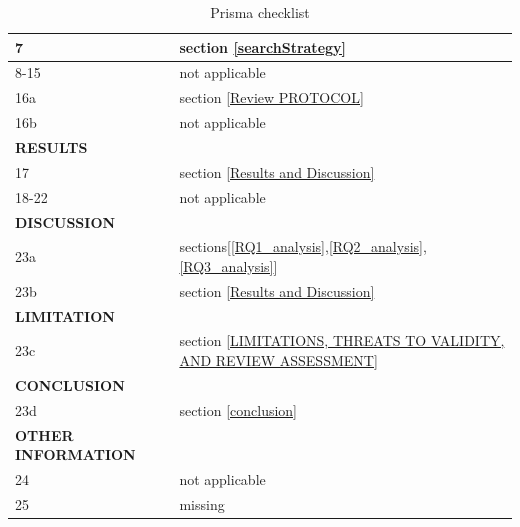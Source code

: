 \documentclass{svproc}
\begin{document}
\begin{table}[]
\begin{tabular}{|ll|l|}
\multicolumn{2}{|l|}{7}                                      & section \ref{searchStrategy}                                          \\ \hline
\multicolumn{2}{|l|}{8-15}                                   & not applicable                                                \\ \hline
\multicolumn{2}{|l|}{16a}                                    & section \ref{Review PROTOCOL}                                                        \\ \hline
\multicolumn{2}{|l|}{16b}                                    & not applicable                                                \\ \hline
\multicolumn{2}{|l|}{\textbf{RESULTS}}                       &                                                               \\ \hline
\multicolumn{2}{|l|}{17}                                     & section \ref{Results and Discussion}                                                    \\ \hline
\multicolumn{2}{|l|}{18-22}                                  & not applicable                                                \\ \hline
\multicolumn{2}{|l|}{\textbf{DISCUSSION}}                    &                                                               \\ \hline
\multicolumn{2}{|l|}{23a}                                    & sections[\ref{RQ1_analysis},\ref{RQ2_analysis},\ref{RQ3_analysis}]                                             \\ \hline
\multicolumn{2}{|l|}{23b}                                    & section \ref{Results and Discussion}                                               \\ \hline
\multicolumn{2}{|l|}{\textbf{LIMITATION}}                   &                                                               \\ \hline
\multicolumn{2}{|l|}{23c}                                    & section \ref{LIMITATIONS, THREATS TO VALIDITY, AND REVIEW ASSESSMENT}                                                 \\ \hline
\multicolumn{2}{|l|}{\textbf{CONCLUSION}}                    &                                                               \\ \hline
\multicolumn{2}{|l|}{23d}                                    & section \ref{conclusion}                                                 \\ \hline
\multicolumn{2}{|l|}{\textbf{OTHER INFORMATION}}             &                                                               \\ \hline
\multicolumn{2}{|l|}{24}                                     & not applicable                                                \\ \hline
\multicolumn{2}{|l|}{25}                                     & missing \\ \hline
\end{tabular}
\caption{Prisma checklist}
\label{Prisma checklist}
\end{table}
\end{document}
